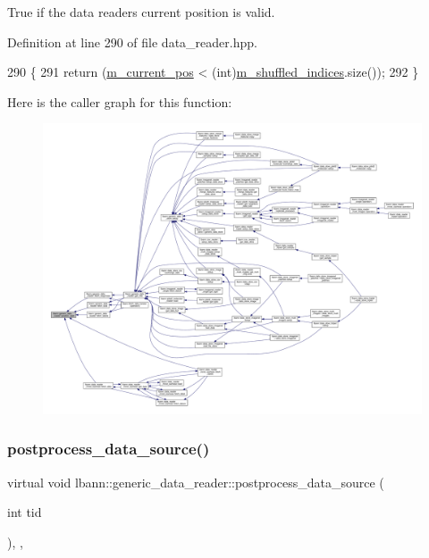 True if the data reader\textquotesingle{}s current position is valid. 



Definition at line 290 of file data\+\_\+reader.\+hpp.


\begin{DoxyCode}
290                               \{
291     \textcolor{keywordflow}{return} (\hyperlink{classlbann_1_1generic__data__reader_a2facf4e410099ac8c1fa586e797ec2e0}{m\_current\_pos} < (\textcolor{keywordtype}{int})\hyperlink{classlbann_1_1generic__data__reader_aaab6aeff67ffff1c689336851fec2c57}{m\_shuffled\_indices}.size());
292   \}
\end{DoxyCode}
Here is the caller graph for this function\+:\nopagebreak
\begin{figure}[H]
\begin{center}
\leavevmode
\includegraphics[width=350pt]{classlbann_1_1generic__data__reader_a2b10538440d784f0f12582a5407acef2_icgraph}
\end{center}
\end{figure}
\mbox{\label{classlbann_1_1generic__data__reader_a7bbf74725a96235dc1cd20ff440a69bd}} 
\subsubsection{\texorpdfstring{postprocess\+\_\+data\+\_\+source()}{postprocess\_data\_source()}}
{\footnotesize\ttfamily virtual void lbann\+::generic\+\_\+data\+\_\+reader\+::postprocess\+\_\+data\+\_\+source (\begin{DoxyParamCaption}\item[{int}]{tid }\end{DoxyParamCaption})\hspace{0.3cm}{\ttfamily [inline]}, {\ttfamily [protected]}, {\ttfamily [virtual]}}

